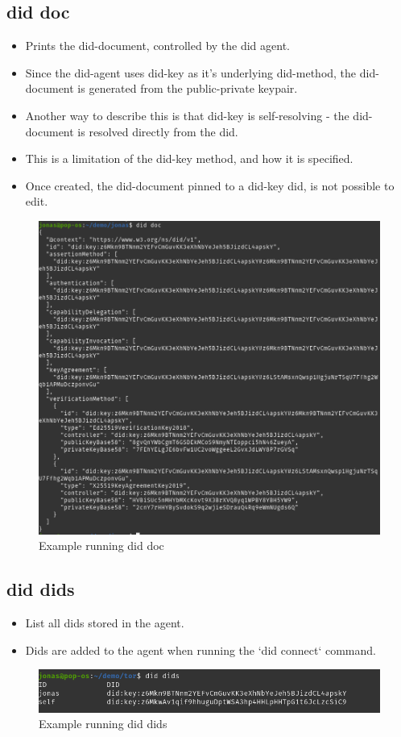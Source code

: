 \subsection{did doc}
\begin{itemize}
\item Prints the did-document, controlled by the did agent.
\item Since the did-agent uses did-key as it's underlying did-method, the did-document is generated from the public-private keypair.
\item Another way to describe this is that did-key is self-resolving - the did-document is resolved directly from the did.
\item This is a limitation of the did-key method, and how it is specified.
\item Once created, the did-document pinned to a did-key did, is not possible to edit.
\end{itemize}
    \begin{figure}[htbp]
      \centering
      \includegraphics[width=.7\textwidth]{figures/cmd-doc.png}
      \caption[]{Example running did doc}
    \end{figure}



\subsection{did dids}
\begin{itemize}
\item List all dids stored in the agent.
\item Dids are added to the agent when running the `did connect` command.
\end{itemize}
    \begin{figure}[htbp]
      \centering
      \includegraphics[width=.7\textwidth]{figures/cmd-dids.png}
      \caption[]{Example running did dids}
    \end{figure}



